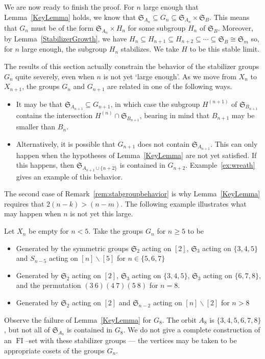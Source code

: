\documentclass[ALCO,ThmDefs,Unicode,epreuves]{cedram}
\DeclareMathOperator{\FI}{FI}
\newcommand{\Sn}{\mathfrak{S}}
\begin{document}
We are now ready to finish the proof. For $n$ large enough that Lemma~\ref{KeyLemma} holds, we know that $\Sn_{A_n} \subseteq G_n \subseteq \Sn_{A_n} \times \Sn_{B}$. This means that $G_n$ must be of the form $\Sn_{A_n} \times H_n$ for some subgroup $H_n$ of $\Sn_B$. Moreover, by Lemma~\ref{StabilizerGrowth}, we have $H_n \subseteq H_{n+1} \subseteq H_{n+2} \subseteq \cdots \subseteq \Sn_B \cong \Sn_m$ so, for $n$ large enough, the subgroup $H_n$ stabilizes. We take $H$ to be this stable limit. \qedsymbol

\begin{remark}
\label{rem:stabgroupbehavior}
The results of this section actually constrain the behavior of the stabilizer groups $G_n$ quite severely, even when $n$ is not yet `large enough'. As we move from $X_n$ to $X_{n+1}$, the groups $G_n$ and $G_{n+1}$ are related in one of the following ways.
\begin{itemize}
\item It may be that $\Sn_{A_{n+1}} \subseteq G_{n+1}$, in which case the subgroup $H^{(n+1)}$ of $\Sn_{B_{n+1}}$ contains the intersection $H^{(n)} \cap \Sn_{B_{n+1}}$, bearing in mind that $B_{n+1}$ may be smaller than $B_n$.
\item Alternatively, it is possible that $G_{n+1}$ does not contain $\Sn_{A_{n+1}}$. This can only happen when the hypotheses of Lemma~\ref{KeyLemma} are not yet satisfied. If this happens, then $\Sn_{A_{n+1} \cup \{n+2\}}$ is contained in $G_{n+2}$. Example~\ref{ex:wreath} gives an example of this behavior.
\end{itemize}
\end{remark} 

The second case of Remark~\ref{rem:stabgroupbehavior} is why Lemma~\ref{KeyLemma} requires that $2(n-k) > (n-m)$. The following example illustrates what may happen when $n$ is not yet this large.

\begin{example}
\label{ex:wreath}
Let $X_n$ be empty for $n < 5$. Take the groups $G_n$ for $n \geq 5$ to be
\begin{itemize}
\item Generated by the symmetric groups $\Sn_{2}$ acting on $[2]$, $\Sn_3$ acting on $\{3,4,5\}$ and $S_{n-5}$ acting on $[n] \backslash [5]$ for $n \in \{5,6,7\}$
\item Generated by $\Sn_{2}$ acting on $[2]$, $\Sn_3$ acting on $\{3,4,5\}$, $\Sn_{3}$ acting on $\{6,7,8\}$, and the permutation $(3 \: 6)(4 \: 7)(5 \: 8)$ for $n = 8$.
\item Generated by $\Sn_{2}$ acting on $[2]$ and $\Sn_{n-2}$ acting on $[n] \backslash [2]$ for $n > 8$
\end{itemize}
Observe the failure of Lemma~\ref{KeyLemma} for $G_8$. The orbit $A_8$ is $\{3,4,5,6,7,8\}$, but not all of $\Sn_{A_8}$ is contained in $G_8$. We do not give a complete construction of an $\FI$--set with these stabilizer groups --- the vertices may be taken to be appropriate cosets of the groups $G_n$.
\end{example}
\end{document}
